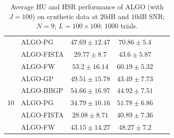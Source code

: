 \begin{table}[h]
\begin{adjustbox}{max width=\textwidth}
\begin{tabular}{|c|l|c|c|c|c|}
                    & ALGO-PG                    & $47.69    \pm 12.47$  & $70.86    \pm 5.4$  \tabularnewline
                    & ALGO-FISTA                 & $29.77    \pm 8.7$    & $43.6     \pm 5.87$ \tabularnewline
                    & ALGO-FW                    & $53.2     \pm 16.14$  & $60.19    \pm 5.32$ \tabularnewline \cline{1-4}
\multirow{5}{*}{10} & ALGO-GP                    & $49.51    \pm 15.78$  & $43.49    \pm 7.73$ \tabularnewline
                    & ALGO-BBGP                  & $54.66    \pm 16.97$  & $44.92    \pm 7.51$ \tabularnewline
                    & ALGO-PG                    & $34.79    \pm 10.16$  & $51.78    \pm 6.86$ \tabularnewline
                    & ALGO-FISTA                 & $28.08    \pm 8.71$   & $40.89    \pm 7.36$ \tabularnewline
                    & ALGO-FW                    & $43.15    \pm 14.27$  & $48.27    \pm 7.2$  \tabularnewline \cline{1-4}
\end{tabular}
\end{adjustbox}
\caption{Average HU and HSR performance of ALGO (with $J=100$) on synthetic
         data at $20$dB and $10$dB SNR; $N = 9$; $L = 100 \times 100$; $1000$
         trials.}
\label{table:results_full_MO9_SNR2010dB_J100}
\end{table}



